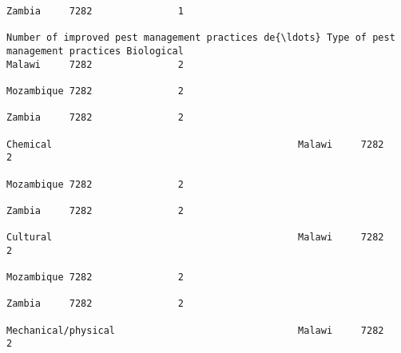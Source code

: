 \documentclass[11pt]{article}
\begin{document}
\begin{Verbatim}[commandchars=\\\{\}]
                                                                                                                                                                                                                 Zambia     7282               1  
                                                                         Number of improved pest management practices de{\ldots} Type of pest management practices Biological                                         Malawi     7282               2  
                                                                                                                                                                                                                 Mozambique 7282               2  
                                                                                                                                                                                                                 Zambia     7282               2  
                                                                                                                                                              Chemical                                           Malawi     7282               2  
                                                                                                                                                                                                                 Mozambique 7282               2  
                                                                                                                                                                                                                 Zambia     7282               2  
                                                                                                                                                              Cultural                                           Malawi     7282               2  
                                                                                                                                                                                                                 Mozambique 7282               2  
                                                                                                                                                                                                                 Zambia     7282               2  
                                                                                                                                                              Mechanical/physical                                Malawi     7282               2  

\end{Verbatim}
\end{document}
